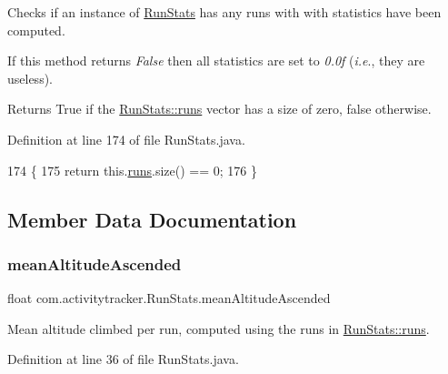 Checks if an instance of \mbox{\hyperlink{classcom_1_1activitytracker_1_1_run_stats}{Run\+Stats}} has any runs with with statistics have been computed.

If this method returns {\itshape False} then all statistics are set to {\itshape 0.\+0f} ({\itshape i.\+e}., they are useless).

\begin{DoxyReturn}{Returns}
True if the \mbox{\hyperlink{classcom_1_1activitytracker_1_1_run_stats_a0fd429e9f463ddf4897c507c0e3c0a12}{Run\+Stats\+::runs}} vector has a size of zero, false otherwise. 
\end{DoxyReturn}


Definition at line 174 of file Run\+Stats.\+java.


\begin{DoxyCode}
174                              \{
175         \textcolor{keywordflow}{return} this.\mbox{\hyperlink{classcom_1_1activitytracker_1_1_run_stats_a0fd429e9f463ddf4897c507c0e3c0a12}{runs}}.size() == 0;
176     \}
\end{DoxyCode}


\subsection{Member Data Documentation}
\mbox{\label{classcom_1_1activitytracker_1_1_run_stats_aecbe62c15075fe9be1604333c355fab6}} 
\subsubsection{\texorpdfstring{mean\+Altitude\+Ascended}{meanAltitudeAscended}}
{\footnotesize\ttfamily float com.\+activitytracker.\+Run\+Stats.\+mean\+Altitude\+Ascended\hspace{0.3cm}{\ttfamily [package]}}

Mean altitude climbed per run, computed using the runs in \mbox{\hyperlink{classcom_1_1activitytracker_1_1_run_stats_a0fd429e9f463ddf4897c507c0e3c0a12}{Run\+Stats\+::runs}}. 

Definition at line 36 of file Run\+Stats.\+java.

\mbox{\label{classcom_1_1activitytracker_1_1_run_stats_a578eae64367a00c625f4685fe879fe7c}} 
